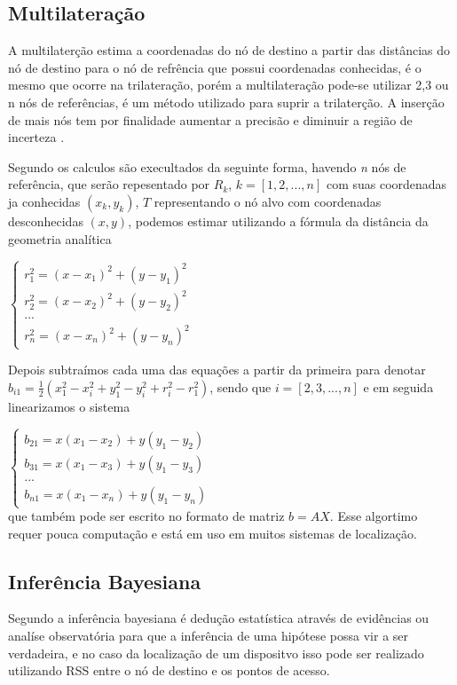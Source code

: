     \subsection{Multilateração}
    A multilaterção estima a coordenadas do nó de destino a partir das distâncias do nó de destino para o nó de refrência que possui coordenadas conhecidas, é o mesmo que ocorre na trilateração, porém a multilateração pode-se utilizar 2,3 ou n nós de referências, é um método utilizado para suprir a trilaterção. A inserção de mais nós tem por finalidade aumentar a precisão e diminuir a região de incerteza \cite{rfid2009review}.
    \par
    Segundo \citeauthor{rfid2009review} os calculos são execultados da seguinte forma, havendo \textit{n} nós de referência, que serão repesentado por $R_k$,  $k = \left[ 1, 2, ... , n \right] $ com suas coordenadas ja conhecidas $( x_k, y_k )$, $T$ representando o nó alvo com coordenadas desconhecidas $(x,y)$, podemos estimar utilizando a fórmula da distância da geometria analítica
    
    $\left \{ \begin{array}{c}
        r_1^2 = (x - x_1 )^2 + (y - y_1)^2  \\
        r_2^2 = (x - x_2 )^2 + (y - y_2)^2  \\
        ...  \\
        r_n^2 = (x - x_n )^2 + (y - y_n)^2 
   \end{array} \right.$
    \par 
    Depois subtraímos cada uma das equações a partir da primeira para denotar $b_{i1}= \frac{1}{2}(x_1^2 - x_i^2 + y_1^2 -y_i^2 + r_i^2 - r_1^2)$, sendo que $i = [2,3, ..., n]$ e em seguida linearizamos o sistema
    
    $\left \{  \begin{array}{c}
        b_{21} = x(x_1 - x_2) + y(y_1 - y_2)  \\
        b_{31} = x(x_1 - x_3) + y(y_1 - y_3)  \\
        ...  \\
        b_{n1} = x(x_1 - x_n) + y(y_1 - y_n)
   \end{array} \right.$\\
     que também pode ser escrito no formato de matriz $b = AX$. Esse algortimo requer pouca computação e está em uso em muitos sistemas de localização.    

    \subsection{Inferência Bayesiana}
  Segundo \citeauthor{bayesian2001} a inferência bayesiana é dedução estatística através de evidências ou analíse observatória para que a inferência de uma hipótese possa vir a ser verdadeira, e no caso da localização de um dispositvo isso pode ser realizado utilizando RSS entre o nó de destino e os pontos de acesso.


